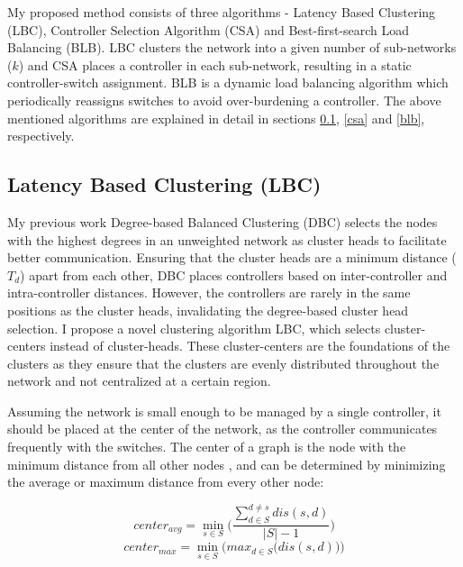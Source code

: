 \documentclass[preprint,12pt]{elsarticle}
\begin{document}
	My proposed method consists of three algorithms - Latency Based Clustering (LBC), Controller Selection Algorithm (CSA) and Best-first-search Load Balancing (BLB). LBC clusters the network into a given number of sub-networks ($k$) and CSA places a controller in each sub-network, resulting in a static controller-switch assignment. BLB is a dynamic load balancing algorithm which periodically reassigns switches to avoid over-burdening a controller. The above mentioned algorithms are explained in detail in sections \ref{lbc}, \ref{csa} and \ref{blb}, respectively.
	
	\subsection{Latency Based Clustering (LBC)} \label{lbc}
	
	My previous work Degree-based Balanced Clustering (DBC) \cite{aziz2019degree} selects the nodes with the highest degrees in an unweighted network as cluster heads to facilitate better communication. Ensuring that the cluster heads are a minimum distance ($T_d$) apart from each other, DBC places controllers based on inter-controller and intra-controller distances. However, the controllers are rarely in the same positions as the cluster heads, invalidating the degree-based cluster head selection. I propose a novel clustering algorithm LBC, which selects cluster-centers instead of cluster-heads. These cluster-centers are the foundations of the clusters as they ensure that the clusters are evenly distributed throughout the network and not centralized at a certain region.
	
	Assuming the network is small enough to be managed by a single controller, it should be placed at the center of the network, as the controller communicates frequently with the switches. The center of a graph is the node with the minimum distance from all other nodes \cite{wilson1979introduction}, and can be determined by minimizing the average or maximum distance from every other node:
	
	\begin{equation} \label{eqn:avgDis}
	center_{avg} = \min_{s\in S}\bigg(\frac{\sum_{d\in S}^{d\ne s}dis(s,d)}{|S|-1}\bigg)
	\end{equation}
	\begin{equation} \label{eqn:maxDis}
	center_{max} = \min_{s\in S}\bigg(max_{d\in S}\big(dis(s,d)\big)\bigg)
	\end{equation}
	
\end{document}
